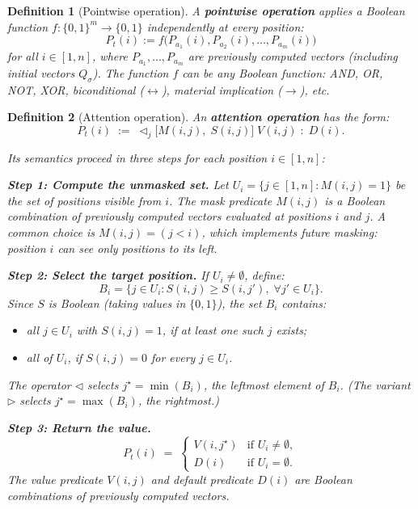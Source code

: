 \documentclass[11pt]{article}
\newtheorem{definition}{Definition}
\begin{document}
\begin{definition}[Pointwise operation]
\label{def:pointwise}
A \textbf{pointwise operation} applies a Boolean function $f : \{0,1\}^m \to \{0,1\}$ independently at every position:
\[
P_t(i) {:=} f\!\bigl(P_{a_1}(i), P_{a_2}(i), \ldots, P_{a_m}(i)\bigr)
\]
for all $i \in [1, n]$, where $P_{a_1}, \ldots, P_{a_m}$ are previously computed vectors (including initial vectors $Q_\sigma$).
The function $f$ can be any Boolean function: AND, OR, NOT, XOR, biconditional ($\leftrightarrow$), material implication ($\to$), etc.
\end{definition}

\begin{definition}[Attention operation]
\label{def:attention}
An \textbf{attention operation} has the form:
\[
P_t(i) \;{:=}\; \triangleleft_j\bigl[M(i,j),\; S(i,j)\bigr]\; V\!(i,j) \;:\; D(i).
\]

Its semantics proceed in three steps for each position $i \in [1,n]$:

\textbf{Step 1: Compute the unmasked set.}
Let $U_i = \{j \in [1,n] : M(i,j) = 1\}$ be the set of positions visible from $i$.
The mask predicate $M(i,j)$ is a Boolean combination of previously computed vectors evaluated at positions $i$ and $j$.
A common choice is $M(i,j) = (j < i)$, which implements future masking: position $i$ can see only positions to its left.

\textbf{Step 2: Select the target position.}
If $U_i \neq \emptyset$, define:
\[
B_i = \{j \in U_i : S(i,j) \geq S(i,j'),\; \forall j' \in U_i\}.
\]
Since $S$ is Boolean (taking values in $\{0,1\}$), the set $B_i$ contains:
\begin{itemize}[itemsep=1pt,leftmargin=*]
    \item all $j \in U_i$ with $S(i,j) = 1$, if at least one such $j$ exists;
    \item all of $U_i$, if $S(i,j) = 0$ for every $j \in U_i$.
\end{itemize}
The operator $\triangleleft$ selects $j^\star = \min(B_i)$, the leftmost element of $B_i$.
(The variant $\triangleright$ selects $j^\star = \max(B_i)$, the rightmost.)

\textbf{Step 3: Return the value.}
\[
P_t(i) \;=\; \begin{cases}
V(i, j^\star) & \text{if } U_i \neq \emptyset, \\
D(i) & \text{if } U_i = \emptyset.
\end{cases}
\]
The value predicate $V(i,j)$ and default predicate $D(i)$ are Boolean combinations of previously computed vectors.
\end{definition}
\end{document}
